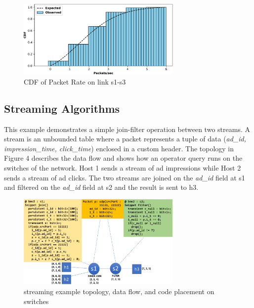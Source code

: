 \begin{figure}[tp]
\centering
\includegraphics[width=80mm,scale=0.7]{figures/exp_obs_cdf}
\caption{CDF of Packet Rate on link s1-s3}
\end{figure}
  
\subsection{Streaming Algorithms}
This example demonstrates a simple join-filter operation between two streams. A stream is an unbounded table where a packet represents a tuple of data (\textit{ad\_id, impression\_time, click\_time}) enclosed in a custom header. The topology in Figure 4 describes the data flow and shows how an operator query runs on the switches of the network. Host 1 sends a stream of ad impressions while Host 2 sends a stream of ad clicks. The two streams are joined on the \textit{ad\_id} field at s1 and filtered on the \textit{ad\_id} field at s2 and the result is sent to h3. 

\begin{figure}[tp]
\centering
\includegraphics[width=80mm,scale=0.7]{figures/streaming_example}
\caption{streaming example topology, data flow, and code placement on switches}
\end{figure}


